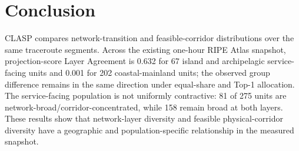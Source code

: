 \section{Conclusion}
\label{sec:conclusion}

CLASP compares network-transition and feasible-corridor distributions over the
same traceroute segments. Across the existing one-hour RIPE Atlas snapshot,
projection-score Layer Agreement is 0.632 for 67 island and archipelagic
service-facing units and 0.001 for 202 coastal-mainland units; the observed
group difference remains in the same direction under equal-share and Top-1
allocation. The service-facing population is not uniformly contractive:
81 of 275 units are network-broad/corridor-concentrated, while 158 remain broad
at both layers. These results show that network-layer diversity and feasible
physical-corridor diversity have a geographic and population-specific
relationship in the measured snapshot.
